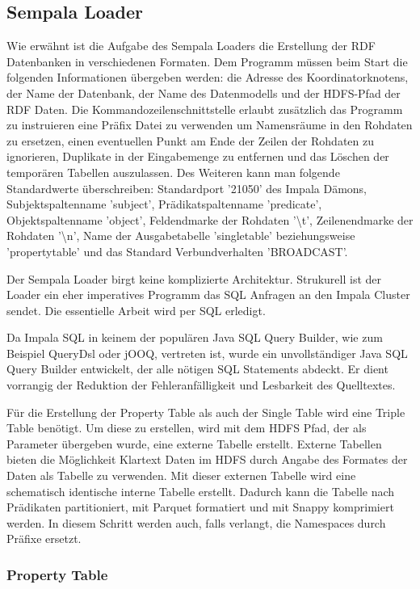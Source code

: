 \documentclass[
  a4paper,
  12pt,
  oneside,
  parskip=half,
  headsepline,
]{scrartcl}
\begin{document}
\subsection{Sempala Loader}
\label{sec:loader}

Wie erwähnt ist die Aufgabe des Sempala Loaders die Erstellung der RDF
Datenbanken in verschiedenen Formaten. Dem Programm müssen beim Start die
folgenden Informationen übergeben werden: die Adresse des Koordinatorknotens,
der Name der Datenbank, der Name des Datenmodells und der HDFS-Pfad der RDF
Daten. Die Kommandozeilenschnittstelle erlaubt zusätzlich das Programm zu
instruieren eine Präfix Datei zu verwenden um Namensräume in den Rohdaten zu
ersetzen, einen eventuellen Punkt am Ende der Zeilen der Rohdaten zu ignorieren,
Duplikate in der Eingabemenge zu entfernen und das Löschen der temporären
Tabellen auszulassen. Des Weiteren kann man folgende Standardwerte
überschreiben: Standardport '21050' des Impala Dämons, Subjektspaltenname
'subject', Prädikatspaltenname 'predicate', Objektspaltenname 'object',
Feld\-endmarke der Rohdaten '\textbackslash t', Zeilenendmarke der Rohdaten
'\textbackslash n', Name der Ausgabetabelle 'singletable' beziehungsweise
'propertytable' und das Standard Verbundverhalten 'BROADCAST'.

Der Sempala Loader birgt keine komplizierte Architektur. Strukurell ist der
Loader ein eher imperatives Programm das SQL Anfragen an den Impala Cluster sendet.
Die essentielle Arbeit wird per SQL erledigt.

Da Impala SQL in keinem der populären Java SQL Query Builder, wie zum Beispiel
QueryDsl oder jOOQ, vertreten ist, wurde ein unvollständiger Java SQL Query
Builder entwickelt, der alle nötigen SQL Statements abdeckt. Er dient vorrangig
der Reduktion der Fehleranfälligkeit und Lesbarkeit des Quelltextes.

Für die Erstellung der Property Table als auch der Single Table wird eine Triple
Table benötigt. Um diese zu erstellen, wird mit dem HDFS Pfad, der als Parameter
übergeben wurde, eine externe Tabelle erstellt. Externe Tabellen bieten die
Möglichkeit Klartext Daten im HDFS durch Angabe des Formates der Daten als
Tabelle zu verwenden. Mit dieser externen Tabelle wird eine schematisch
identische interne Tabelle erstellt. Dadurch kann die Tabelle nach Prädikaten
partitioniert, mit Parquet formatiert und mit Snappy komprimiert werden. In
diesem Schritt werden auch, falls verlangt, die Namespaces durch Präfixe
ersetzt.

\subsubsection{Property Table}
\end{document}
